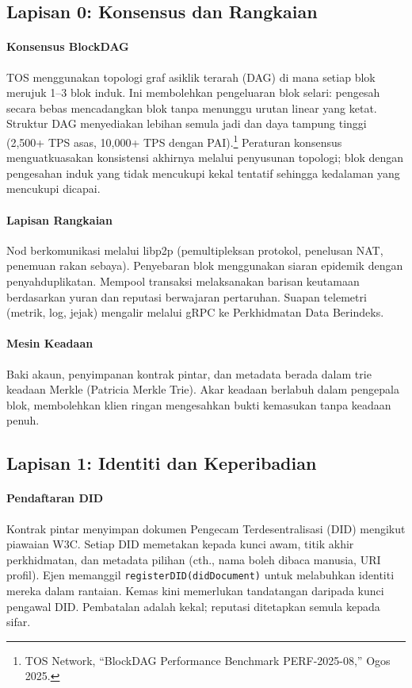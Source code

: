 \documentclass[11pt]{article}
\begin{document}
\subsection{Lapisan 0: Konsensus dan Rangkaian}
\paragraph{Konsensus BlockDAG} TOS menggunakan topologi graf asiklik terarah (DAG) di mana setiap blok merujuk 1--3 blok induk. Ini membolehkan pengeluaran blok selari: pengesah secara bebas mencadangkan blok tanpa menunggu urutan linear yang ketat. Struktur DAG menyediakan lebihan semula jadi dan daya tampung tinggi (2,500+ TPS asas, 10,000+ TPS dengan PAI).\footnote{TOS Network, ``BlockDAG Performance Benchmark PERF-2025-08,'' Ogos 2025.} Peraturan konsensus menguatkuasakan konsistensi akhirnya melalui penyusunan topologi; blok dengan pengesahan induk yang tidak mencukupi kekal tentatif sehingga kedalaman yang mencukupi dicapai.

\paragraph{Lapisan Rangkaian} Nod berkomunikasi melalui libp2p (pemultipleksan protokol, penelusan NAT, penemuan rakan sebaya). Penyebaran blok menggunakan siaran epidemik dengan penyahduplikatan. Mempool transaksi melaksanakan barisan keutamaan berdasarkan yuran dan reputasi berwajaran pertaruhan. Suapan telemetri (metrik, log, jejak) mengalir melalui gRPC ke Perkhidmatan Data Berindeks.

\paragraph{Mesin Keadaan} Baki akaun, penyimpanan kontrak pintar, dan metadata berada dalam trie keadaan Merkle (Patricia Merkle Trie). Akar keadaan berlabuh dalam pengepala blok, membolehkan klien ringan mengesahkan bukti kemasukan tanpa keadaan penuh.

\subsection{Lapisan 1: Identiti dan Keperibadian}
\paragraph{Pendaftaran DID} Kontrak pintar menyimpan dokumen Pengecam Terdesentralisasi (DID) mengikut piawaian W3C. Setiap DID memetakan kepada kunci awam, titik akhir perkhidmatan, dan metadata pilihan (cth., nama boleh dibaca manusia, URI profil). Ejen memanggil \texttt{registerDID(didDocument)} untuk melabuhkan identiti mereka dalam rantaian. Kemas kini memerlukan tandatangan daripada kunci pengawal DID. Pembatalan adalah kekal; reputasi ditetapkan semula kepada sifar.
\end{document}
